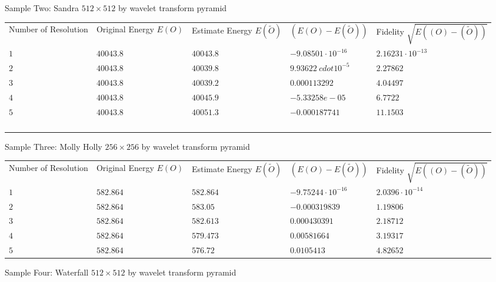\documentclass[11pt]{article}
\begin{document}
Sample Two: Sandra $512 \times 512$ by wavelet transform pyramid 

\begin{tabular}{lllll}
{\tiny Number of Resolution} & {\tiny Original Energy }$E(O)$ & {\tiny 
Estimate Energy }$E(\widetilde{O})$ & $(E(O)-E(\widetilde{O}))$ & {\tiny 
Fidelity }$\sqrt{E((O)-(\widetilde{O}))}$ \\ 
$1$ & $40043.8$ &  $40043.8$ &$ -9.08501 \cdot 10^{-16} $&  $2.16231 \cdot 10^{-13}$\\ 
$2$ & $40043.8$  & $40039.8$ & $9.93622\ cdot 10^{-5}$ & $2.27862$ \\ 
$3$ & $40043.8$  & $40039.2$ & $0.000113292$  & $4.04497$  \\ 
$4$ & $40043.8$  & $40045.9$  & $-5.33258e-05$  & $6.7722$  \\ 
$5$& $40043.8$  & $40051.3$  & $-0.000187741$  & $11.1503$  \\ 
&  &  &  &  \\ 
&  &  &  &  \\ 
&  &  &  &  \\ 
&  &  &  & 
\end{tabular}


Sample Three: Molly Holly $256 \times 256$ by wavelet transform pyramid 

\begin{tabular}{lllll}
{\tiny Number of Resolution} & {\tiny Original Energy }$E(O)$ & {\tiny 
Estimate Energy }$E(\widetilde{O})$ & $(E(O)-E(\widetilde{O}))$ & {\tiny 
Fidelity }$\sqrt{E((O)-(\widetilde{O}))}$ \\ 
$1$ & $582.864 $ & $582.864$ &  $-9.75244\cdot 10^{-16}$ & $2.0396 \cdot 10^{-14}$ \\ 
$2$ & $582.864 $& $583.05 $  & $-0.000319839$ & $1.19806 $  \\ 
$3$ &  $582.864$ & $582.613$ & $0.000430391$  & $2.18712$ \\ 
$4$ & $582.864$ & $579.473$ & $0.00581664$ &  $3.19317$ \\ 
$5$ & $582.864$ & $576.72$ & $0.0105413$ & $4.82652$ 

\end{tabular}


Sample Four: Waterfall $512 \times 512$ by wavelet transform pyramid 
\end{document}
